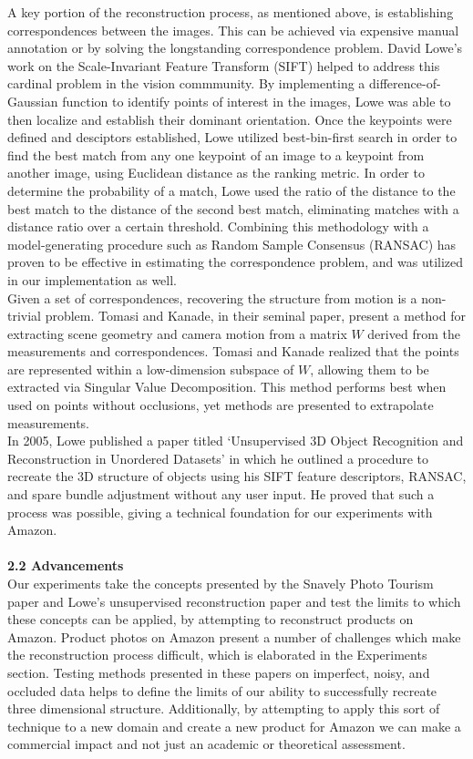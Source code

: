 \documentclass[12pt]{article}
\begin{document}
\begin{multicols}{2}
\indent A key portion of the reconstruction process, as mentioned above, is establishing correspondences between the images. This can be achieved via expensive manual annotation or by solving the longstanding correspondence problem. David Lowe's work on the Scale-Invariant Feature Transform (SIFT) helped to address this cardinal problem in the vision commmunity. By implementing a difference-of-Gaussian function to identify points of interest in the images, Lowe was able to then localize and establish their dominant orientation. Once the keypoints were defined and desciptors established, Lowe utilized best-bin-first search in order to find the best match from any one keypoint of an image to a keypoint from another image, using Euclidean distance as the ranking metric. In order to determine the probability of a match, Lowe used the ratio of the distance to the best match to the distance of the second best match, eliminating matches with a distance ratio over a certain threshold. Combining this methodology with a model-generating procedure such as Random Sample Consensus (RANSAC) has proven to be effective in estimating the correspondence problem, and was utilized in our implementation as well. \\
\indent Given a set of correspondences, recovering the structure from motion is a non-trivial problem. Tomasi and Kanade, in their seminal paper, present a method for extracting scene geometry and camera motion from a matrix $W$ derived from the measurements and correspondences. Tomasi and Kanade realized that the points are represented within a low-dimension subspace of $W$, allowing them to be extracted via Singular Value Decomposition. This method performs best when used on points without occlusions, yet methods are presented to extrapolate measurements. \\
\indent In 2005, Lowe published a paper titled `Unsupervised 3D Object Recognition and Reconstruction in Unordered Datasets' in which he outlined a procedure to recreate the 3D structure of objects using his SIFT feature descriptors, RANSAC, and spare bundle adjustment without any user input. He proved that such a process was possible, giving a technical foundation for our experiments with Amazon.\\\\
{\large \textbf{2.2 Advancements}}\\
Our experiments take the concepts presented by the Snavely Photo Tourism paper and Lowe's unsupervised reconstruction paper and test the limits to which these concepts can be applied, by attempting to reconstruct products on Amazon. Product photos on Amazon present a number of challenges which make the reconstruction process difficult, which is elaborated in the Experiments section. Testing methods presented in these papers on imperfect, noisy, and occluded data helps to define the limits of our ability to successfully recreate three dimensional structure. Additionally, by attempting to apply this sort of technique to a new domain and create a new product for Amazon we can make a commercial impact and not just an academic or theoretical assessment. \\\\

\end{multicols}
\end{document}

